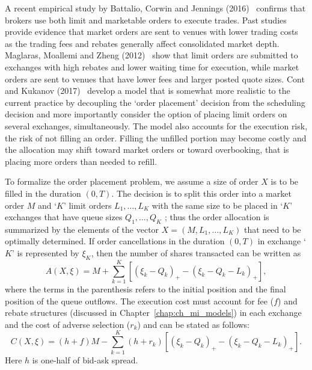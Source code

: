 A recent empirical study by Battalio, Corwin and Jennings (2016)~\cite{battcorjen} confirms that brokers use both limit and marketable orders to execute trades. Past studies provide evidence that market orders are sent to venues with lower trading costs as the trading fees and rebates generally affect consolidated market depth. Maglaras, Moallemi and Zheng (2012)~\cite{magmoazhe} show that limit orders are submitted to exchanges with high rebates and lower waiting time for execution, while market orders are sent to venues that have lower fees and larger posted quote sizes. Cont and Kukanov (2017)~\cite{contk} develop a model that is somewhat more realistic to the current practice by decoupling the `order placement' decision from the scheduling decision and more importantly consider the option of placing limit orders on several exchanges, simultaneously. The model also accounts for the execution risk, the risk of not filling an order. Filling the unfilled portion may become costly and the allocation may shift toward market orders or toward overbooking, that is placing more orders than needed to refill.


To formalize the order placement problem, we assume a size of order $X$ is to be filled in the duration $(0,T)$. The decision is to split this order into a market order $M$ and `$K$' limit orders $L_1, \ldots, L_K$ with the same size to be placed in `$K$' exchanges that have queue sizes $Q_1, \ldots, Q_K$ ; thus the order allocation is summarized by the elements of the vector $X=(M, L_1, \ldots, L_K)$ that need to be optimally determined. If order cancellations in the duration $(0,T)$ in exchange `$K$' is represented by $\xi_K$, then the number of shares transacted can be written as 
	\begin{equation} \label{eqn:axe}
	A(X,\xi)= M + \sum_{k=1}^K \left[ (\xi_k - Q_k)_+ - (\xi_k - Q_k - L_k)_+ \right],
	\end{equation}
where the terms in the parenthesis refers to the initial position and the final position of the queue outflows. The execution cost must account for fee ($f$) and rebate structures (discussed in Chapter~\ref{chap:ch_mi_models}) in each exchange and the cost of adverse selection ($r_k$) and can be stated as follows:
	\begin{equation}\label{eqn:cxe}
	C(X,\xi)= (h+f) M - \sum_{k=1}^K (h+r_k) \left[ (\xi_k - Q_k)_+ - (\xi_k - Q_k - L_k)_+ \right].
	\end{equation}
Here $h$ is one-half of bid-ask spread. 


